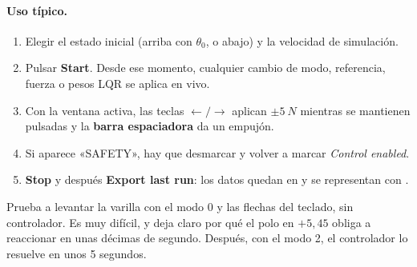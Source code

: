 \paragraph{Uso típico.}
\begin{enumerate}
  \item Elegir el estado inicial (arriba con $\theta_0$, o abajo) y la velocidad de simulación.
  \item Pulsar \textbf{Start}. Desde ese momento, cualquier cambio de modo, referencia, fuerza o pesos LQR se aplica en vivo.
  \item Con la ventana activa, las teclas $\leftarrow/\rightarrow$ aplican $\pm\SI{5}{N}$ mientras se mantienen pulsadas y la \textbf{barra espaciadora} da un empujón.
  \item Si aparece «SAFETY», hay que desmarcar y volver a marcar \emph{Control enabled}.
  \item \textbf{Stop} y después \textbf{Export last run}: los datos quedan en  y se representan con .
\end{enumerate}

\begin{nota}
Prueba a levantar la varilla con el modo 0 y las flechas del teclado, sin controlador. Es muy difícil, y deja claro por qué el polo en $+5{,}45$ obliga a reaccionar en unas décimas de segundo. Después, con el modo 2, el controlador lo resuelve en unos 5 segundos.
\end{nota}
